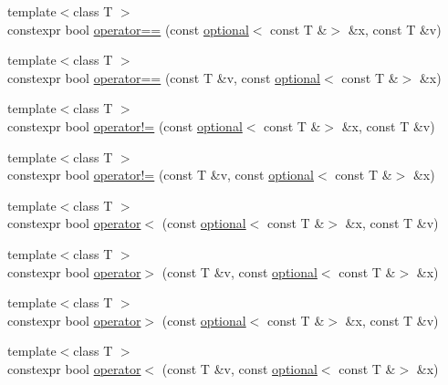 \begin{DoxyCompactItemize}
{\footnotesize template$<$class T $>$ }\\constexpr bool \hyperlink{namespacestd_1_1experimental_ad41e06efa15d85ead93eafecb8dde126}{operator==} (const \hyperlink{classstd_1_1experimental_1_1optional}{optional}$<$ const T \&$>$ \&x, const T \&v)
\item 
{\footnotesize template$<$class T $>$ }\\constexpr bool \hyperlink{namespacestd_1_1experimental_a9ff726fa7b981eeae6f6b8e98eb514ce}{operator==} (const T \&v, const \hyperlink{classstd_1_1experimental_1_1optional}{optional}$<$ const T \&$>$ \&x)
\item 
{\footnotesize template$<$class T $>$ }\\constexpr bool \hyperlink{namespacestd_1_1experimental_a007e24ca3b589918778709281a5611d7}{operator!=} (const \hyperlink{classstd_1_1experimental_1_1optional}{optional}$<$ const T \&$>$ \&x, const T \&v)
\item 
{\footnotesize template$<$class T $>$ }\\constexpr bool \hyperlink{namespacestd_1_1experimental_ab5a8b15ec09913c93bac27399f0cba38}{operator!=} (const T \&v, const \hyperlink{classstd_1_1experimental_1_1optional}{optional}$<$ const T \&$>$ \&x)
\item 
{\footnotesize template$<$class T $>$ }\\constexpr bool \hyperlink{namespacestd_1_1experimental_afd3f43608dc3267d32ee592ae88fba55}{operator$<$} (const \hyperlink{classstd_1_1experimental_1_1optional}{optional}$<$ const T \&$>$ \&x, const T \&v)
\item 
{\footnotesize template$<$class T $>$ }\\constexpr bool \hyperlink{namespacestd_1_1experimental_a3899be1cf909f9d5dc2718c912c73d67}{operator$>$} (const T \&v, const \hyperlink{classstd_1_1experimental_1_1optional}{optional}$<$ const T \&$>$ \&x)
\item 
{\footnotesize template$<$class T $>$ }\\constexpr bool \hyperlink{namespacestd_1_1experimental_ab62a91459215563e8996e69785166789}{operator$>$} (const \hyperlink{classstd_1_1experimental_1_1optional}{optional}$<$ const T \&$>$ \&x, const T \&v)
\item 
{\footnotesize template$<$class T $>$ }\\constexpr bool \hyperlink{namespacestd_1_1experimental_a3905d16fb3b1c1627ff2082e6159d4fb}{operator$<$} (const T \&v, const \hyperlink{classstd_1_1experimental_1_1optional}{optional}$<$ const T \&$>$ \&x)

\end{DoxyCompactItemize}
